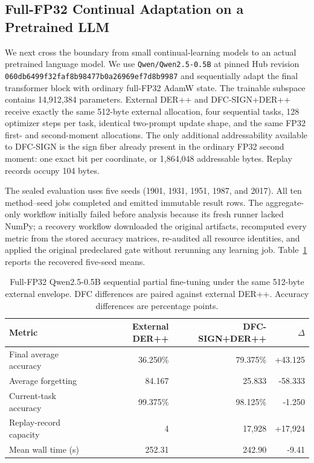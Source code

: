 
\subsection{Full-FP32 Continual Adaptation on a Pretrained LLM}
\label{sec:qwen_partial}

We next cross the boundary from small continual-learning models to an actual
pretrained language model.  We use \texttt{Qwen/Qwen2.5-0.5B} at pinned Hub
revision \texttt{060db6499f32faf8b98477b0a26969ef7d8b9987} and sequentially
adapt the final transformer block with ordinary full-FP32 AdamW state.  The
trainable subspace contains 14,912,384 parameters.  External DER++ and
DFC-SIGN+DER++ receive exactly the same 512-byte external allocation, four
sequential tasks, 128 optimizer steps per task, identical two-prompt update
shape, and the same FP32 first- and second-moment allocations.  The only
additional addressability available to DFC-SIGN is the sign fiber already
present in the ordinary FP32 second moment: one exact bit per coordinate,
or 1,864,048 addressable bytes.  Replay records occupy 104 bytes.

The sealed evaluation uses five seeds (1901, 1931, 1951, 1987, and 2017).
All ten method--seed jobs completed and emitted immutable result rows.  The
aggregate-only workflow initially failed before analysis because its fresh
runner lacked NumPy; a recovery workflow downloaded the original artifacts,
recomputed every metric from the stored accuracy matrices, re-audited all
resource identities, and applied the original predeclared gate without
rerunning any learning job.  Table~\ref{tab:qwen_partial} reports the recovered
five-seed means.

\begin{table}[t]
\centering
\caption{Full-FP32 Qwen2.5-0.5B sequential partial fine-tuning under the
same 512-byte external envelope.  DFC differences are paired against external
DER++.  Accuracy differences are percentage points.}
\label{tab:qwen_partial}
\setlength{\tabcolsep}{4.5pt}
\begin{tabular}{lrrr}
\hline
Metric & External DER++ & DFC-SIGN+DER++ & $\Delta$ \\
\hline
Final average accuracy & 36.250\% & 79.375\% & +43.125 \\
Average forgetting & 84.167 & 25.833 & -58.333 \\
Current-task accuracy & 99.375\% & 98.125\% & -1.250 \\
Replay-record capacity & 4 & 17,928 & +17,924 \\
Mean wall time (s) & 252.31 & 242.90 & -9.41 \\
\hline
\end{tabular}
\end{table}

